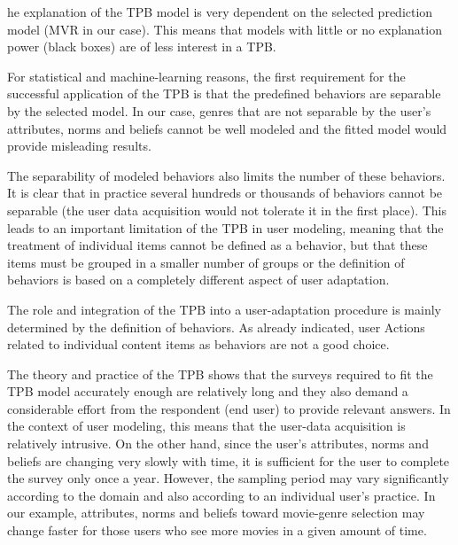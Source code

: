 \documentclass{llncs}
\begin{document}
he explanation of the TPB model is very dependent on the selected prediction model (MVR in our case). This means that models with little or no explanation power (black boxes) are of less interest in a TPB.%


\vspace{0.6em}
  For statistical and machine-learning reasons, the first requirement for the successful application of the TPB is that the predefined behaviors are separable by the selected model. In our case, genres that are not separable by the user’s attributes, norms and beliefs cannot be well modeled and the fitted model would provide misleading results.

The separability of modeled behaviors also limits the number of these behaviors. It is clear that in practice several hundreds or thousands of behaviors cannot be separable (the user data acquisition would not tolerate it in the first place). This leads to an important limitation of the TPB in user modeling, meaning that the treatment of individual items cannot be defined as a behavior, but that these items must be grouped in a smaller number of groups or the definition of behaviors is based on a completely different aspect of user adaptation. 

\vspace{0.6em}
 The role and integration of the TPB into a user-adaptation procedure is mainly determined by the definition of behaviors. As already indicated, user Actions related to individual content items as behaviors are not a good choice.

\vspace{0.6em}
 The theory and practice of the TPB shows that the surveys required to fit the TPB model accurately enough are relatively long and they also demand a considerable effort from the respondent (end user) to provide relevant answers. In the context of user modeling, this means that the user-data acquisition is relatively intrusive. On the other hand, since the user’s attributes, norms and beliefs are changing very slowly with time, it is sufficient for the user to complete the survey only once a year. However, the sampling period may vary significantly according to the domain and also according to an individual user’s practice. In our example, attributes, norms and beliefs toward movie-genre selection may change faster for those users who see more movies in a given amount of time.
\end{document}
